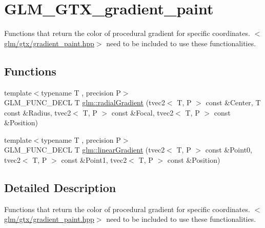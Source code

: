 \hypertarget{group__gtx__gradient__paint}{\section{G\-L\-M\-\_\-\-G\-T\-X\-\_\-gradient\-\_\-paint}
\label{group__gtx__gradient__paint}
}


Functions that return the color of procedural gradient for specific coordinates. $<$\hyperlink{gradient__paint_8hpp}{glm/gtx/gradient\-\_\-paint.\-hpp}$>$ need to be included to use these functionalities.  


\subsection*{Functions}
\begin{DoxyCompactItemize}
\item 
{\footnotesize template$<$typename T , precision P$>$ }\\G\-L\-M\-\_\-\-F\-U\-N\-C\-\_\-\-D\-E\-C\-L T \hyperlink{group__gtx__gradient__paint_ga166d43d567a4cf150579a92f69b0dc9f}{glm\-::radial\-Gradient} (tvec2$<$ T, P $>$ const \&Center, T const \&Radius, tvec2$<$ T, P $>$ const \&Focal, tvec2$<$ T, P $>$ const \&Position)
\item 
{\footnotesize template$<$typename T , precision P$>$ }\\G\-L\-M\-\_\-\-F\-U\-N\-C\-\_\-\-D\-E\-C\-L T \hyperlink{group__gtx__gradient__paint_gacde26d5e0c4a1856467bded9dfad9040}{glm\-::linear\-Gradient} (tvec2$<$ T, P $>$ const \&Point0, tvec2$<$ T, P $>$ const \&Point1, tvec2$<$ T, P $>$ const \&Position)
\end{DoxyCompactItemize}


\subsection{Detailed Description}
Functions that return the color of procedural gradient for specific coordinates. $<$\hyperlink{gradient__paint_8hpp}{glm/gtx/gradient\-\_\-paint.\-hpp}$>$ need to be included to use these functionalities. 

